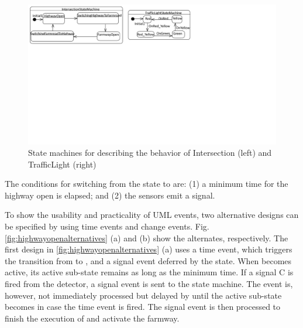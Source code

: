 \begin{figure}
	\centering
	\includegraphics[clip, trim=0.2cm 13.6cm 11.4cm 0.2cm, width=1.0\columnwidth]{figures/casestudystatemachine}
	\caption{State machines for describing the behavior of Intersection (left) and TrafficLight (right)} 
	\label{fig:casestudystatemachine}
\end{figure}


The conditions for switching from the state  to  are: (1) a minimum time for the highway open is elapsed; and (2) the sensors emit a signal.

To show the usability and practicality of UML events, two alternative designs can be specified by using time events and change events. 
Fig. \ref{fig:highwayopenalternatives} (a) and (b) show the alternates, respectively.
The first design in \ref{fig:highwayopenalternatives} (a) uses a time event, which triggers the transition from  to , and a signal event deferred by the  state. 
When  becomes active, its active sub-state remains  as long as the minimum time.
If a signal C is fired from the detector, a signal event  is sent to the state machine.
The event is, however, not immediately processed but delayed by until the active sub-state becomes  in case the time event is fired.
The signal event is then processed to finish the execution of  and activate the farmway.

